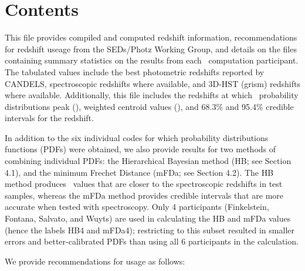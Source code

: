 \section*{Contents}
This file provides compiled and computed redshift information, recommendations for redshift useage from the SEDs/Photz Working Group, and details on the files containing summary statistics on the results from each \photoz\ computation participant.  The tabulated values include the best photometric redshifts reported by CANDELS, spectroscopic redshifts where available, and 3D-HST (grism) redshifts where available. Additionally, this file includes the redshifts at which \photoz\ probability distributions peak (\zpeak), weighted centroid values (\zweight), and 68.3\% and 95.4\% credible intervals for the redshift.

In addition to the six individual codes for which probability distributions functions (PDFs) were obtained, we also provide results for two methods of combining individual PDFs: the Hierarchical Bayesian method (HB; see Section 4.1), and the minimum Frechet Distance (mFDa; see Section 4.2). The HB method produces \zweight\ values that are closer to the spectroscopic redshifts in test samples, whereas the mFDa method provides credible intervals that are more accurate when tested with spectroscopy.  Only 4 participants (Finkelstein, Fontana, Salvato, and Wuyts) are used in calculating the HB and mFDa values (hence the labels HB4 and mFDa4); restricting to this subset resulted in smaller errors and better-calibrated PDFs than using all 6 participants in the calculation.

We provide recommendations for usage as follows:

